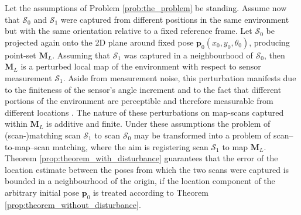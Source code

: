 Let the assumptions of Problem \ref{prob:the_problem} be standing. Assume now
that $\mathcal{S}_0$ and $\mathcal{S}_1$ were captured from different
positions in the same environment but with the same orientation
relative to a fixed reference frame. Let $\mathcal{S}_0$ be projected again onto
the 2D plane around fixed pose $\bm{p}_0(x_0, y_0, \theta_0)$, producing
point-set $\bm{M}_L$. Assuming that $\mathcal{S}_1$ was captured in a
neighbourhood of $\mathcal{S}_0$, then $\bm{M}_L$ is a perturbed local map of
the environment with respect to sensor measurement $\mathcal{S}_1$. Aside from
measurement noise, this perturbation manifests due to the finiteness of the
sensor's angle increment and to the fact that different portions of the
environment are perceptible and therefore measurable from different locations
\cite{olson}. The nature of these perturbations on map-scans captured within
$\bm{M}_L$ is additive and finite. Under these assumptions the problem of
(scan-)matching scan $\mathcal{S}_1$ to scan $\mathcal{S}_0$ may be transformed
into a problem of scan--to-map--scan matching, where the aim is registering
scan $\mathcal{S}_1$ to map $\bm{M}_L$. Theorem
\ref{prop:theorem_with_disturbance} guarantees that the error of the location
estimate between the poses from which the two scans were captured is
bounded in a neighbourhood of the origin, if the location component of the
arbitrary initial pose $\bm{p}_0$ is treated according to Theorem
\ref{prop:theorem_without_disturbance}.


